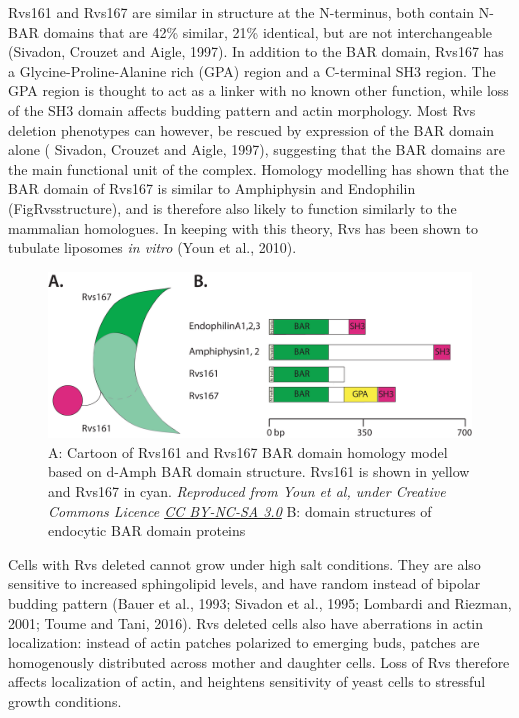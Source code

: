 	\vspace{5mm}
Rvs161 and Rvs167 are similar in structure at the N-terminus, both contain N-BAR domains that are 42\% similar, 21\% identical, but are not interchangeable (Sivadon, Crouzet and Aigle, 1997). In addition to the BAR domain, Rvs167 has a Glycine-Proline-Alanine rich (GPA) region and a C-terminal SH3 region. The GPA region is thought to act as a linker with no known other function, while loss of the SH3 domain affects budding pattern and actin morphology. Most Rvs deletion phenotypes can however, be rescued by expression of the BAR domain alone ( Sivadon, Crouzet and Aigle, 1997), suggesting that the BAR domains are the main functional unit of the complex. Homology modelling has shown that the BAR domain of Rvs167 is similar to Amphiphysin and Endophilin (FigRvsstructure), and is therefore also likely to function similarly to the mammalian homologues. In keeping with this theory, Rvs has been shown to tubulate liposomes \textit{in vitro} (Youn et al., 2010). 


\vspace{5mm}
\begin{figure}[H]
	\centering
	\includegraphics[scale=0.3]{figures/intro/Rvs_stucture2}
	\caption[Homolgy model of Rvs and BAR protein domains]
	{A: Cartoon of Rvs161 and Rvs167 BAR domain homology model based on d-Amph BAR domain structure. Rvs161 is shown in yellow and Rvs167 in cyan. 
		\textit{Reproduced from Youn et al, under Creative Commons Licence \href{https://creativecommons.org/licenses/by-nc-sa/3.0/}{CC BY-NC-SA 3.0}}
		B: domain structures of endocytic BAR domain proteins
		\label{rvs_structure}}
\end{figure}


	\vspace{5mm}
	\newpage
Cells with Rvs deleted cannot grow under high salt conditions. They are also sensitive to increased sphingolipid levels, and have random instead of bipolar budding pattern (Bauer et al., 1993; Sivadon et al., 1995; Lombardi and Riezman, 2001; Toume and Tani, 2016). Rvs deleted cells also have aberrations in actin localization: instead of actin patches polarized to emerging buds, patches are homogenously distributed across mother and daughter cells. Loss of Rvs therefore affects localization of actin, and heightens sensitivity of yeast cells to stressful growth conditions.
 	
